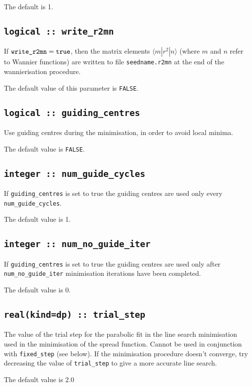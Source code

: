 The default is 1.

\subsection[write\_r2mn]{\tt logical :: write\_r2mn}

If $\verb#write_r2mn#=\verb#true#$, then the matrix elements
$\langle m|r^2|n\rangle$ (where $m$ and $n$ refer to Wannier functions) are written
to file \verb#seedname.r2mn# at the end of the wannierisation procedure.

The default value of this parameter is \verb#FALSE#.


\subsection[guiding\_centres]{\tt logical :: guiding\_centres}
Use guiding centres during the minimisation, in order to avoid
local minima.

The default value is \verb#FALSE#.

\subsection[num\_guide\_cycles]{\tt integer :: num\_guide\_cycles}
If \verb#guiding_centres# is set to true the
guiding centres are used only every \verb#num_guide_cycles#.

The default value is 1.

\subsection[num\_no\_guide\_iter]{\tt integer :: num\_no\_guide\_iter}
If \verb#guiding_centres# is set to true the
guiding centres are used only after \verb#num_no_guide_iter#
minimisation iterations have been completed.

The default value is 0.

\subsection[trial\_step]{\tt real(kind=dp) :: trial\_step}
The value of the trial step for the parabolic fit in the line
search minimisation used in the minimisation of the spread
function. Cannot be used in conjunction with \verb#fixed_step# (see
below). If the minimisation procedure doesn't converge, try decreasing
the value of \verb#trial_step# to give a more accurate line search.

The default value is 2.0

